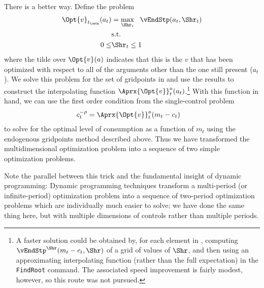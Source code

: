 \documentclass[titlepage, headings=optiontotocandhead]{Resources/texmf-local/tex/latex/econtex}
\begin{document}
There is a better way.  Define the problem
\begin{equation}\begin{gathered}\begin{aligned}
      \Opt{v}_{{t_\cntn}}(a_{t})  & = \max_{\Shr_{t}} ~~  \vEndStp(a_{t},\Shr_{t})
      \\      & \text{s.t.} \nonumber
      \\      0 \leq & \Shr_{t} \leq 1
    \end{aligned}\end{gathered}\end{equation}
where the tilde over $\Opt{v}(a)$ indicates that this is the $v$ that has been optimized with respect to all of the arguments other than the one still present ($a_{t}$).  We solve this problem for the set of gridpoints in  and use the results to construct the interpolating function $\Aprx{\Opt{v}}_{t}^{a}(a_{t})$.\footnote{A faster solution could be obtained by, for each element in , computing $\vEndStp^{\Shr}(m_{t}-c_{t},\Shr)$ of a grid of values of $\Shr$, and then using an approximating interpolating function (rather than the full expectation) in the \texttt{FindRoot} command.  The associated speed improvement is fairly modest, however, so this route was not pursued.}  With this function in hand, we can use the first order condition from the single-control problem
\begin{equation*}\begin{gathered}\begin{aligned}
      c_{t}^{-\rho}  & = \Aprx{\Opt{v}}_{t}^{a}(m_{t}-c_{t})
    \end{aligned}\end{gathered}\end{equation*}
to solve for the optimal level of consumption as a function of $m_{t}$ using the endogenous gridpoints method described above.  Thus we have transformed the multidimensional optimization problem into a sequence of two simple optimization problems.

Note the parallel between this trick and the fundamental insight of dynamic programming: Dynamic programming techniques transform a multi-period (or infinite-period) optimization problem into a sequence of two-period optimization problems which are individually much easier to solve; we have done the same thing here, but with multiple dimensions of controls rather than multiple periods.
\end{document}
